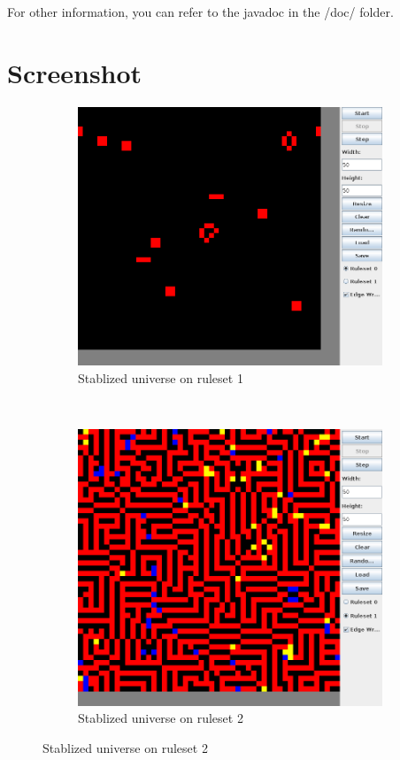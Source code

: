 \documentclass[12pt,a4paper]{article}
\begin{document}
For other information, you can refer to the javadoc in the /doc/ folder.


\newpage
\section{Screenshot}
\begin{figure}[h!]
        \centering
        \begin{subfigure}[b]{0.5\textwidth}
                \includegraphics[width=\textwidth]{r1out}
                \caption{Stablized universe on ruleset 1}
        \end{subfigure}%
        ~ %
        \begin{subfigure}[b]{0.5\textwidth}
                \includegraphics[width=\textwidth]{r2out}
                \caption{Stablized universe on ruleset 2}
                \label{fig:r2out}
        \end{subfigure}


\end{figure}
\end{document}
